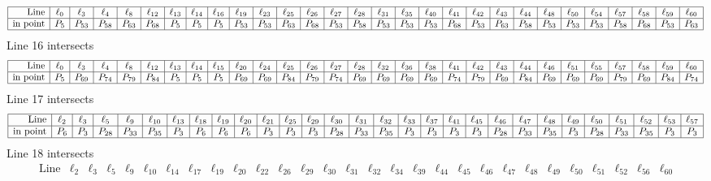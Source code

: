 \documentclass{article}
\begin{document}
{$$\begin{array}{|r*{28}{|c}|}
\hline
\mbox{Line}  & \ell_{0} & \ell_{3} & \ell_{4} & \ell_{8} & \ell_{12} & \ell_{13} & \ell_{14} & \ell_{16} & \ell_{19} & \ell_{23} & \ell_{25} & \ell_{26} & \ell_{27} & \ell_{28} & \ell_{31} & \ell_{35} & \ell_{40} & \ell_{41} & \ell_{42} & \ell_{43} & \ell_{44} & \ell_{48} & \ell_{50} & \ell_{54} & \ell_{57} & \ell_{58} & \ell_{59} & \ell_{60}\\
\hline
\mbox{in point}  & P_{5} & P_{53} & P_{58} & P_{63} & P_{68} & P_{5} & P_{5} & P_{5} & P_{53} & P_{53} & P_{63} & P_{68} & P_{53} & P_{58} & P_{53} & P_{53} & P_{53} & P_{68} & P_{53} & P_{63} & P_{58} & P_{53} & P_{53} & P_{53} & P_{58} & P_{68} & P_{53} & P_{63}\\
\hline
\end{array}
$$
Line 16 intersects 
$$
\begin{array}{|r*{28}{|c}|}
\hline
\mbox{Line}  & \ell_{0} & \ell_{3} & \ell_{4} & \ell_{8} & \ell_{12} & \ell_{13} & \ell_{14} & \ell_{15} & \ell_{20} & \ell_{24} & \ell_{25} & \ell_{26} & \ell_{27} & \ell_{28} & \ell_{32} & \ell_{36} & \ell_{38} & \ell_{41} & \ell_{42} & \ell_{43} & \ell_{44} & \ell_{46} & \ell_{51} & \ell_{55} & \ell_{57} & \ell_{58} & \ell_{59} & \ell_{60}\\
\hline
\mbox{in point}  & P_{5} & P_{69} & P_{74} & P_{79} & P_{84} & P_{5} & P_{5} & P_{5} & P_{69} & P_{69} & P_{84} & P_{79} & P_{74} & P_{69} & P_{69} & P_{69} & P_{69} & P_{74} & P_{79} & P_{69} & P_{84} & P_{69} & P_{69} & P_{69} & P_{79} & P_{69} & P_{84} & P_{74}\\
\hline
\end{array}
$$
Line 17 intersects 
$$
\begin{array}{|r*{28}{|c}|}
\hline
\mbox{Line}  & \ell_{2} & \ell_{3} & \ell_{5} & \ell_{9} & \ell_{10} & \ell_{13} & \ell_{18} & \ell_{19} & \ell_{20} & \ell_{21} & \ell_{25} & \ell_{29} & \ell_{30} & \ell_{31} & \ell_{32} & \ell_{33} & \ell_{37} & \ell_{41} & \ell_{45} & \ell_{46} & \ell_{47} & \ell_{48} & \ell_{49} & \ell_{50} & \ell_{51} & \ell_{52} & \ell_{53} & \ell_{57}\\
\hline
\mbox{in point}  & P_{6} & P_{3} & P_{28} & P_{33} & P_{35} & P_{3} & P_{6} & P_{6} & P_{6} & P_{3} & P_{3} & P_{3} & P_{28} & P_{33} & P_{35} & P_{3} & P_{3} & P_{3} & P_{3} & P_{28} & P_{33} & P_{35} & P_{3} & P_{28} & P_{33} & P_{35} & P_{3} & P_{3}\\
\hline
\end{array}
$$
Line 18 intersects 
$$
\begin{array}{|r*{28}{|c}|}
\hline
\mbox{Line}  & \ell_{2} & \ell_{3} & \ell_{5} & \ell_{9} & \ell_{10} & \ell_{14} & \ell_{17} & \ell_{19} & \ell_{20} & \ell_{22} & \ell_{26} & \ell_{29} & \ell_{30} & \ell_{31} & \ell_{32} & \ell_{34} & \ell_{39} & \ell_{44} & \ell_{45} & \ell_{46} & \ell_{47} & \ell_{48} & \ell_{49} & \ell_{50} & \ell_{51} & \ell_{52} & \ell_{56} & \ell_{60}\\

\end{array}$$}
\end{document}

